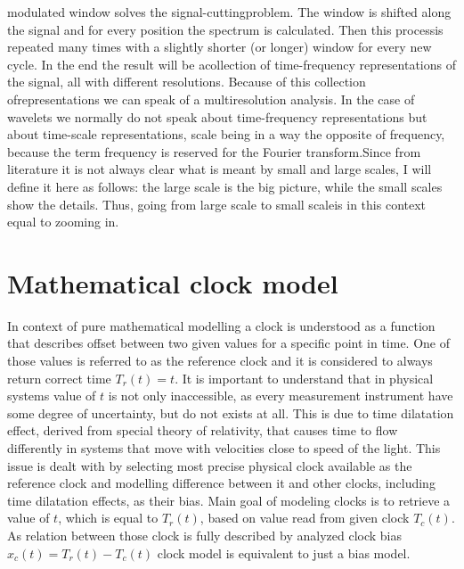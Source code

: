 modulated window solves the signal-cuttingproblem.
The window is shifted along the signal and for every position the spectrum is calculated.
Then this processis repeated many times with a slightly shorter (or longer) window for 
every new cycle.
In the end the result will be acollection of time-frequency representations of the signal, 
all with different resolutions. Because of this collection ofrepresentations we can speak of a
multiresolution analysis. 
In the case of wavelets we normally do not speak about time-frequency representations but about
time-scale representations, scale being in a way the opposite of frequency,
because the term frequency is reserved for the Fourier transform.Since from literature it is not 
always clear what is meant by small and large scales,
I will define it here as follows: the large scale is the big picture, while the small scales show 
the details. Thus, going from large scale to small scaleis in this context equal to zooming in.

\section{Mathematical clock model}
In context of pure mathematical modelling a clock is understood as a function that describes
offset between two given values for a specific point in time. One of those values is referred 
to as the reference clock and it is considered to always return correct time $T_{r}(t)=t$.
It is important to understand that in physical systems value of $t$ is not only inaccessible, as
every measurement instrument have some degree of uncertainty, but do not exists at all.
This is due to time dilatation effect, derived from special theory of relativity, that causes
time to flow differently in systems that move with velocities close to speed of the light.
This issue is dealt with by selecting most precise physical clock available as the reference
clock and modelling difference between it and other clocks, including time dilatation effects,
as their bias.
Main goal of modeling clocks is to retrieve a value of $t$, which is equal to $T_{r}(t)$, based
on value read from given clock $T_{c}(t)$. 
As relation between those clock is fully described by analyzed clock bias 
$x_{c}(t)=T_{r}(t)-T_{c}(t)$ clock model is equivalent to just a bias model.

